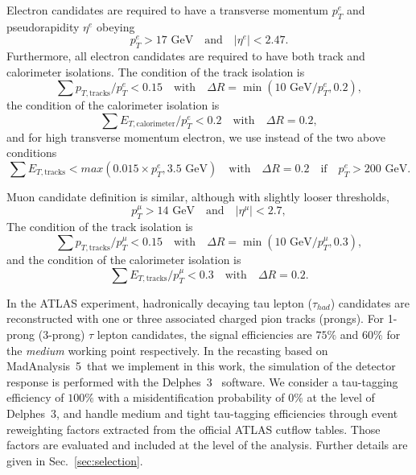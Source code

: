 \documentclass{ws-mpla}
\newcommand{\madanalysis}{{\sc MadAnalysis~5}}
\begin{document}
Electron candidates are required to have a transverse momentum $p^e_T$ and pseudorapidity $\eta^e$ obeying
\begin{equation}
p^e_T > 17 \textrm{ GeV}\quad \textrm{and}\quad |\eta^e| < 2.47.
\end{equation}
Furthermore, all electron candidates are required to have both track and calorimeter isolations. The condition of the track isolation is
\begin{equation}
\sum p_{T,\textrm{tracks}}/p^e_T < 0.15\quad \textrm{with}\quad \Delta R=\min(10\textrm{ GeV}/p^e_T,0.2),
\end{equation}
the condition of the calorimeter isolation is
\begin{equation}
\sum E_{T,\textrm{calorimeter}}/p^e_T < 0.2\quad \textrm{with}\quad \Delta R=0.2,
\end{equation}
and for high transverse momentum electron, we use instead of the two above conditions
\begin{equation}
\sum E_{T,\textrm{tracks}} < max(0.015\times p^e_T,3.5\textrm{ GeV})\quad \textrm{with}\quad \Delta R=0.2\quad \textrm{if}\quad p^e_T > 200\textrm{ GeV}.
\end{equation}

Muon candidate definition is similar, although with slightly looser thresholds,
\begin{equation}
p^{\mu}_T > 14 \textrm{ GeV}\quad \textrm{and}\quad |\eta^{\mu}| < 2.7,
\end{equation}
The condition of the track isolation is 
\begin{equation}
\sum p_{T,\textrm{tracks}}/p^{\mu}_T < 0.15\quad \textrm{with}\quad \Delta R=\min(10\textrm{ GeV}/p^{\mu}_T,0.3),
\end{equation}
and the condition of the calorimeter isolation is
\begin{equation}
\sum E_{T,\textrm{tracks}}/p^{\mu}_T < 0.3\quad \textrm{with}\quad \Delta R=0.2.
\end{equation}

In the ATLAS experiment, hadronically decaying tau lepton ($\tau_{had}$) candidates are reconstructed with one or three associated charged pion tracks (prongs).
For 1-prong (3-prong) $\tau$ lepton candidates, the signal efficiencies are $75\%$ and $60\%$ for the \textit{medium} working point respectively.
In the recasting based on \madanalysis\ that we implement in this work, the simulation of the detector response is performed with the {\sc Delphes}~3~\cite{deFavereau:2013fsa} software. We consider a tau-tagging efficiency of $100\%$ with a misidentification probability of $0\%$ at the level of {\sc Delphes}~3, and handle medium and tight tau-tagging efficiencies through event reweighting factors extracted from the official ATLAS cutflow tables. Those factors are evaluated and included at the level of the analysis. Further details are given in Sec.~\ref{sec:selection}.
\end{document}
